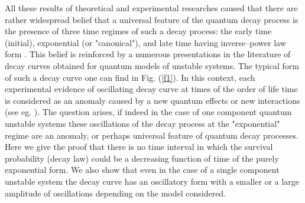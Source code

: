 \documentclass[12pt]{article}
\begin{document}
All these results of theoretical and experimental researches caused that
there are rather widespread belief that a universal feature of the quantum decay process is the presence of three
time regimes of such a decay process:
the early time (initial), exponential (or "canonical"), and late time having inverse--power law form \cite{peshkin}.
This  belief is reinforced by a numerous presentations in the literature of decay curves obtained for quantum models of unstable systems. The typical form of such a decay curve one can find in Fig. (\ref{f1}).
In this context, each experimental  evidence of oscillating decay curve at times of the order of life time is considered as an anomaly caused by a new quantum effects or new interactions (see eg. \cite{litwinov1,kienle}).
The question arises, if indeed in the case of one component quantum unstable systems these oscillations of the decay process at the "exponential" regime are an anomaly, or perhaps universal feature of quantum decay processes.
Here
we give the proof that there is no time interval in which the survival probability (decay law) could be a decreasing function of time of the purely exponential form.
We also show that even in the case of a single component unstable system the decay  curve has an oscillatory form with a smaller or a large amplitude of oscillations depending on the model considered.
\end{document}
